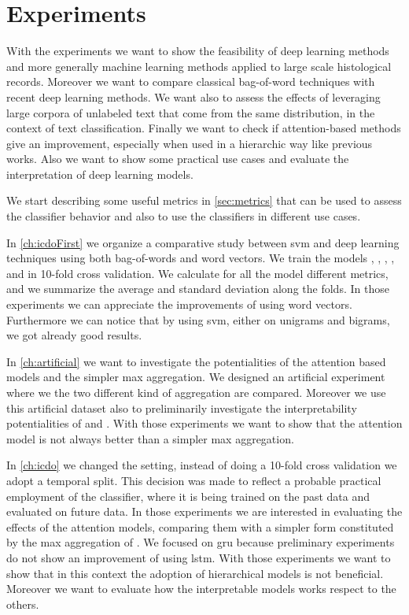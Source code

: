 \chapter{Experiments}
With the experiments we want to show the feasibility of deep learning
methods and more generally machine learning methods applied to large
scale histological records. Moreover we want to compare classical
bag-of-word techniques with recent deep learning methods. We want also
to assess the effects of leveraging large corpora of unlabeled text
that come from the same distribution, in the context of text
classification. Finally we want to check if attention-based methods
give an improvement, especially when used in a hierarchic way like
previous works. Also we want to show some practical use cases and
evaluate the interpretation of deep learning models.

We start describing some useful metrics in \cref{sec:metrics} that can
be used to assess the 
classifier behavior and also to use the classifiers in different use
cases.

In \cref{ch:icdoFirst} we organize a comparative study between
\ac{svm} and deep learning techniques using both bag-of-words and word
vectors. We train the models \svm, \svmb, \lstmng, \lstmc, and
\lstmb in 10-fold cross validation. We calculate for all the model
different metrics, and we summarize the average and standard deviation
along the folds. In those 
experiments we can appreciate the improvements of using word
vectors. Furthermore we can notice that by using \ac{svm}, either on
unigrams and bigrams, we got already good results.

In \ref{ch:artificial} we want to investigate the potentialities of
the attention based models and the simpler max aggregation. We
designed an artificial experiment where we the two different
kind of aggregation are compared. Moreover we use this artificial
dataset also to preliminarily investigate the interpretability
potentialities of \maxi{} and \softmaxi{}. With those experiments we
want to show that the attention model is not always better than a
simpler max aggregation.

In \cref{ch:icdo} we changed the setting, instead of doing a 10-fold
cross validation we adopt a temporal split. This decision was made to
reflect a probable practical employment of the classifier, where it is
being trained on the past data and evaluated on future data. In those
experiments we are interested in evaluating the effects of the
attention models, comparing them with a simpler form constituted by
the max aggregation of \maxp{}. We focused on \ac{gru} because
preliminary experiments do not show an improvement of using
\ac{lstm}. With those experiments we want to show that in this context
the adoption of hierarchical models is not beneficial. Moreover we
want to evaluate how the interpretable models works respect to the
others.

